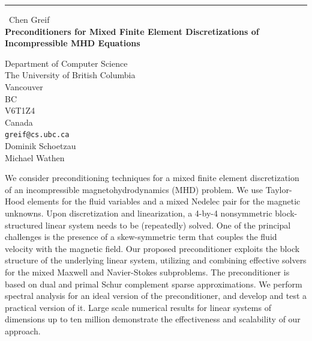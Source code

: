 \documentclass{report}
\begin{document}
\begin{center}
\rule{6in}{1pt} \
{\large Chen Greif \\
{\bf Preconditioners for Mixed Finite Element Discretizations of Incompressible MHD Equations}}

Department of Computer Science \\ The University of British Columbia \\ Vancouver \\ BC \\ V6T1Z4 \\ Canada
\\
{\tt greif@cs.ubc.ca}\\
Dominik Schoetzau\\
Michael Wathen\end{center}

We consider preconditioning techniques for a mixed finite element
discretization of an incompressible magnetohydrodynamics (MHD) problem.
We use Taylor-Hood elements for the fluid variables and a mixed Nedelec
pair for the magnetic unknowns. Upon discretization and linearization, a
4-by-4 nonsymmetric block-structured linear system needs to be
(repeatedly) solved. One of the principal challenges is the presence of a
skew-symmetric term that couples the fluid velocity with the magnetic
field. Our proposed preconditioner exploits the block structure of the
underlying linear system, utilizing and combining effective solvers for
the mixed Maxwell and Navier-Stokes subproblems. The preconditioner is
based on dual and primal Schur complement sparse approximations. We
perform spectral analysis for an ideal version of the preconditioner, and
develop and test a practical version of it. Large scale numerical results
for linear systems of dimensions up to ten million demonstrate the
effectiveness and scalability of our approach.
\end{document}
